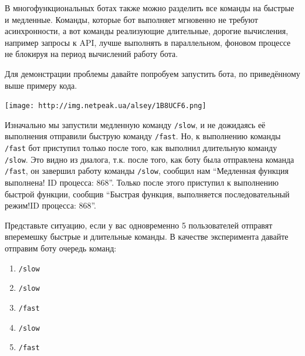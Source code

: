 \documentclass[
]{book}
\newenvironment{Shaded}{\begin{snugshade}}{\end{snugshade}}
\newcommand{\CommentTok}[1]{\textcolor[rgb]{0.56,0.35,0.01}{\textit{#1}}}
\newcommand{\FunctionTok}[1]{\textcolor[rgb]{0.13,0.29,0.53}{\textbf{#1}}}
\newcommand{\NormalTok}[1]{#1}
\newcommand{\OtherTok}[1]{\textcolor[rgb]{0.56,0.35,0.01}{#1}}
\newcommand{\SpecialCharTok}[1]{\textcolor[rgb]{0.81,0.36,0.00}{\textbf{#1}}}
\newcommand{\StringTok}[1]{\textcolor[rgb]{0.31,0.60,0.02}{#1}}
\providecommand{\tightlist}{%
  \setlength{\itemsep}{0pt}\setlength{\parskip}{0pt}}
\begin{document}
\begin{Shaded}
\end{Shaded}

В многофункциональных ботах также можно разделить все команды на быстрые и медленные. Команды, которые бот выполняет мгновенно не требуют асинхронности, а вот команды реализующие длительные, дорогие вычисления, например запросы к API, лучше выполнять в параллельном, фоновом процессе не блокируя на период вычислений работу бота.

Для демонстрации проблемы давайте попробуем запустить бота, по приведённому выше примеру кода.

\texttt{[image: http://img.netpeak.ua/alsey/1B8UCF6.png]}

Изначально мы запустили медленную команду \texttt{/slow}, и не дожидаясь её выполнения отправили быструю команду \texttt{/fast}. Но, к выполнению команды \texttt{/fast} бот приступил только после того, как выполнил длительную команду \texttt{/slow}. Это видно из диалога, т.к. после того, как боту была отправлена команда \texttt{/fast}, он завершил работу команды \texttt{/slow}, сообщил нам ``Медленная функция выполнена! ID процесса: 868''. Только после этого приступил к выполнению быстрой функции, сообщив ``Быстрая функция, выполняется последовательный режим!ID процесса: 868''.

Представьте ситуацию, если у вас одновременно 5 пользователей отправят вперемешку быстрые и длительные команды. В качестве эксперимента давайте отправим боту очередь команд:

\begin{enumerate}
\def\labelenumi{\arabic{enumi}.}
\tightlist
\item
  \texttt{/slow}
\item
  \texttt{/slow}
\item
  \texttt{/fast}
\item
  \texttt{/slow}
\item
  \texttt{/fast}
\end{enumerate}
\end{document}
